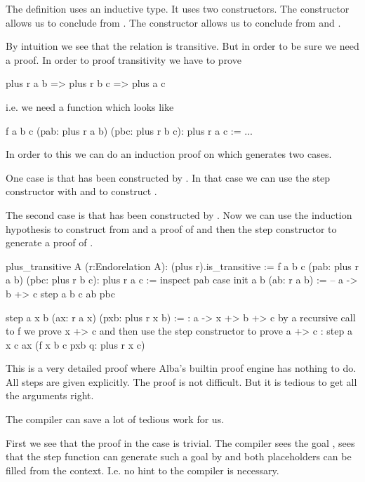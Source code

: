 The definition uses an inductive type. It uses two constructors. The
 constructor allows us to conclude  from .
The  constructor allows us to conclude  from
 and .

By intuition we see that the relation  is transitive. But in
order to be sure we need a proof. In order to proof transitivity we have to
prove
%
\begin{alba}
  plus r a b => plus r b c => plus a c
\end{alba}
%
i.e. we need a function which looks like
%
\begin{alba}
  f a b c (pab: plus r a b) (pbc: plus r b c): plus r a c :=
    ...
\end{alba}
%
In order to this we can do an induction proof on  which
generates two cases.

One case is that  has been constructed
by . In that case we can use the step constructor with
 and  to construct .

The second case is that   has been constructed by . Now we can use the induction
hypothesis to construct from  and  a proof of  and then the step constructor to generate a proof of .


\begin{alba}
  plus_transitive A (r:Endorelation A): (plus r).is_transitive :=
    f a b c (pab: plus r a b) (pbc: plus r b c): plus r a c :=
      inspect
        pab
      case
        init a b (ab: r a b) :=
            -- a -> b +> c
          step a b c ab pbc

        step a x b (ax: r a x) (pxb: plus r x b) :=
            {: a -> x +> b +> c
               by a recursive call to f we prove x +> c
               and then use the step constructor to prove a +> c :}
          step a x c ax (f x b c pxb q: plus r x c)
\end{alba}

This is a very detailed proof where Alba's builtin proof engine has nothing to
do. All steps are given explicitly. The proof is not difficult. But it is
tedious to get all the arguments right.

The compiler can save  a lot of tedious work for us.

First we see that the proof in the  case is trivial. The compiler
sees the goal , sees that the step function can generate such
a goal by  and both placeholders
can be filled from the context. I.e. no hint to the compiler is necessary.

